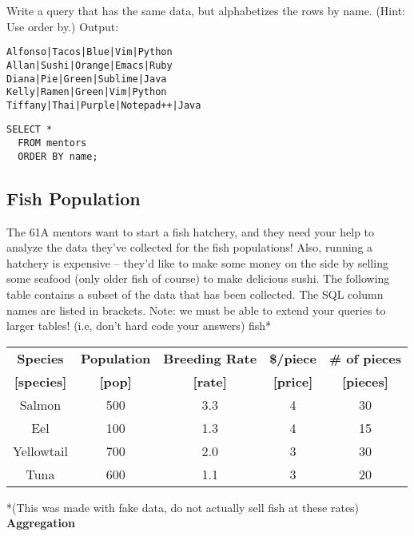 \documentclass{exam}
\begin{document}
\begin{questions}
\begin{blocksection}
\question Write a query that has the same data, but alphabetizes the rows by name. (Hint: Use order by.) \newline
Output:
\begin{lstlisting}
Alfonso|Tacos|Blue|Vim|Python
Allan|Sushi|Orange|Emacs|Ruby
Diana|Pie|Green|Sublime|Java
Kelly|Ramen|Green|Vim|Python
Tiffany|Thai|Purple|Notepad++|Java
\end{lstlisting}
\begin{solution}[1in]
\begin{lstlisting}
SELECT * 
  FROM mentors
  ORDER BY name;
\end{lstlisting}
\end{solution}
\end{blocksection}


\begin{blocksection}
\section{Fish Population} 
The 61A mentors want to start a fish hatchery, and they need your help to analyze the data they've collected for the fish populations! Also, running a hatchery is expensive -- they'd like to make some money on the side by selling some seafood (only older fish of course) to make delicious sushi. \newline
\newline
The following table contains a subset of the data that has been collected. The SQL column names are listed in brackets. Note: we must be able to extend your queries to larger tables! (i.e, don't hard code your answers) \newline
\newline
fish*
\begin{center}
\begin{tabular}{ |c|c|c|c|c| } 
 \hline
 \textbf{Species} & \textbf{Population} & \textbf{Breeding Rate} & \textbf{\$/piece} & \textbf{\# of pieces} \\ 
  \textbf{[species]} & \textbf{[pop]} & \textbf{[rate]} & \textbf{[price]} & \textbf{[pieces]} \\ 
 \hline
 Salmon & 500 & 3.3 & 4 & 30 \\ 
 \hline
 Eel & 100 & 1.3 & 4 & 15 \\ 
 \hline
  Yellowtail & 700 & 2.0 & 3 & 30 \\ 
 \hline
 Tuna & 600 & 1.1 & 3 & 20 \\ 
 \hline
\end{tabular}
\end{center}
*(This was made with fake data, do not actually sell fish at these rates)
\question \textbf{Aggregation} 
\begin{parts}

\end{parts}
\end{blocksection}
\end{questions}
\end{document}
